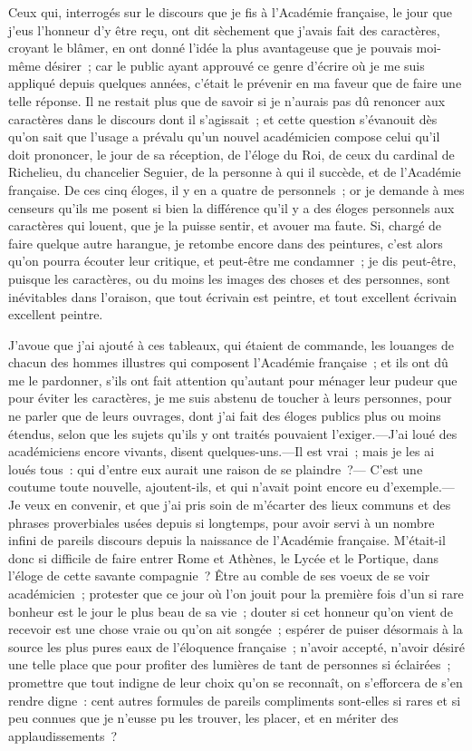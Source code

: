 \documentclass[french,twoside]{book} %
\newcommand\chaptercont{} %
\begin{document}
\chaptercont
\noindent Ceux qui, interrogés sur le discours que je fis à l’Académie française, le jour que j’eus l’honneur d’y être reçu, ont dit sèchement que j’avais fait des caractères, croyant le blâmer, en ont donné l’idée la plus avantageuse que je pouvais moi-même désirer ; car le public ayant approuvé ce genre d’écrire où je me suis appliqué depuis quelques années, c’était le prévenir en ma faveur que de faire une telle réponse. Il ne restait plus que de savoir si je n’aurais pas dû renoncer aux caractères dans le discours dont il s’agissait ; et cette question s’évanouit dès qu’on sait que l’usage a prévalu qu’un nouvel académicien compose celui qu’il doit prononcer, le jour de sa réception, de l’éloge du Roi, de ceux du cardinal de Richelieu, du chancelier Seguier, de la personne à qui il succède, et de l’Académie française. De ces cinq éloges, il y en a quatre de personnels ; or je demande à mes censeurs qu’ils me posent si bien la différence qu’il y a des éloges personnels aux caractères qui louent, que je la puisse sentir, et avouer ma faute. Si, chargé de faire quelque autre harangue, je retombe encore dans des peintures, c’est alors qu’on pourra écouter leur critique, et peut-être me condamner ; je dis peut-être, puisque les caractères, ou du moins les images des choses et des personnes, sont inévitables dans l’oraison, que tout écrivain est peintre, et tout excellent écrivain excellent peintre.\par
J'avoue que j’ai ajouté à ces tableaux, qui étaient de commande, les louanges de chacun des hommes illustres qui composent l’Académie française ; et ils ont dû me le pardonner, s’ils ont fait attention qu’autant pour ménager leur pudeur que pour éviter les caractères, je me suis abstenu de toucher à leurs personnes, pour ne parler que de leurs ouvrages, dont j’ai fait des éloges publics plus ou moins étendus, selon que les sujets qu’ils y ont traités pouvaient l’exiger.—J'ai loué des académiciens encore vivants, disent quelques-uns.—Il est vrai ; mais je les ai loués tous : qui d’entre eux aurait une raison de se plaindre ?— C'est une coutume toute nouvelle, ajoutent-ils, et qui n’avait point encore eu d’exemple.—Je veux en convenir, et que j’ai pris soin de m’écarter des lieux communs et des phrases proverbiales usées depuis si longtemps, pour avoir servi à un nombre infini de pareils discours depuis la naissance de l’Académie française. M'était-il donc si difficile de faire entrer Rome et Athènes, le Lycée et le Portique, dans l’éloge de cette savante compagnie ? Être au comble de ses voeux de se voir académicien ; protester que ce jour où l’on jouit pour la première fois d’un si rare bonheur est le jour le plus beau de sa vie ; douter si cet honneur qu’on vient de recevoir est une chose vraie ou qu’on ait songée ; espérer de puiser désormais à la source les plus pures eaux de l’éloquence française ; n’avoir accepté, n’avoir désiré une telle place que pour profiter des lumières de tant de personnes si éclairées ; promettre que tout indigne de leur choix qu’on se reconnaît, on s’efforcera de s’en rendre digne : cent autres formules de pareils compliments sont-elles si rares et si peu connues que je n’eusse pu les trouver, les placer, et en mériter des applaudissements ?\par
\end{document}
